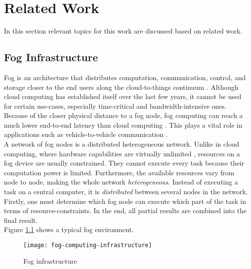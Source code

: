 \chapter{Related Work\label{cha:relwork}}
In this section relevant topics for this work are discussed based on related work.

\section{Fog Infrastructure}
Fog is an architecture that distributes computation, communication, control, and storage closer to the end users along the cloud-to-things continuum \cite{fog-research-opportunities}.
Although cloud computing has established itself over the last few years, it cannot be used for certain use-cases, especially time-critical and bandwidth-intensive ones. Because of the closer physical distance to a fog node, fog computing can reach a much lower end-to-end latency than cloud computing \cite{mobility-aware-scheduling}\cite{novel-load-balancing}. This plays a vital role in applications such as vehicle-to-vehicle communication \cite{novel-load-balancing}.\\

A network of fog nodes is a distributed heterogeneous network. Unlike in cloud computing, where hardware capabilities are virtually unlimited \cite{fogtorch}, resources on a fog device are usually constrained. They cannot execute every task because their computation power is limited. Furthermore, the available resources vary from node to node, making the whole network \textit{heterogeneous}. Instead of executing a task on a central computer, it is \textit{distributed} between several nodes in the network.
Firstly, one must determine which fog node can execute which part of the task in terms of resource-constraints.
In the end, all partial results are combined into the final result.\\

Figure \ref{fig:foginfrastructure} shows a typical fog environment.

\begin{figure}
    \centering
    \texttt{[image: fog-computing-infrastructure]}
    \caption{Fog infrastructure}
    \label{fig:foginfrastructure}
\end{figure}

